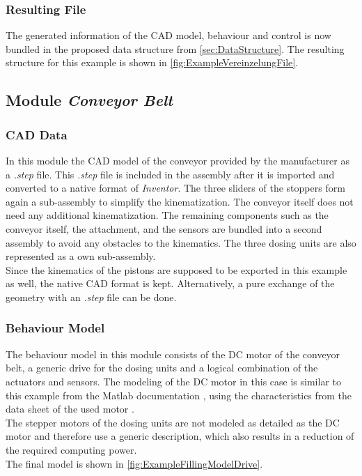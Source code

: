 \subsubsection{Resulting File}
    The generated information of the CAD model, behaviour and control is now bundled in the proposed data structure from \autoref{sec:DataStructure}. The resulting structure for this example is shown in \autoref{fig:ExampleVereinzelungFile}. 
	

\subsection{Module \textit{Conveyor Belt}}
\subsubsection{CAD Data}
    In this module the CAD model of the conveyor provided by the manufacturer as a \textit{.step} file. This \textit{.step} file is included in the assembly after it is imported and converted to a native format of \textit{Inventor}. The three sliders of the stoppers form again a sub-assembly to simplify the kinematization. The conveyor itself does not need any additional kinematization. The remaining components such as the conveyor itself, the attachment, and the sensors are bundled into a second assembly to avoid any obstacles to the kinematics. The three dosing units are also represented as a own sub-assembly. \\
  
   Since the kinematics of the pistons are supposed to be exported in this example as well, the native CAD format is kept. Alternatively, a pure exchange of the geometry with an \textit{.step} file can be done.

\subsubsection{Behaviour Model}
    The behaviour model in this module consists of the DC motor of the conveyor belt, a generic drive for the dosing units and a logical combination of the actuators and sensors. The modeling of the DC motor in this case is similar to this example from the Matlab documentation \cite{SimulinkExampleDcMotorControl}, using the characteristics from the data sheet of the used motor \cite{DataSheetDCMotor}. \\
    The stepper motors of the dosing units are not modeled as detailed as the DC motor and therefore use a generic description, which also results in a reduction of the required computing power. \\
    The final model is shown in \autoref{fig:ExampleFillingModelDrive}.  \\
    


